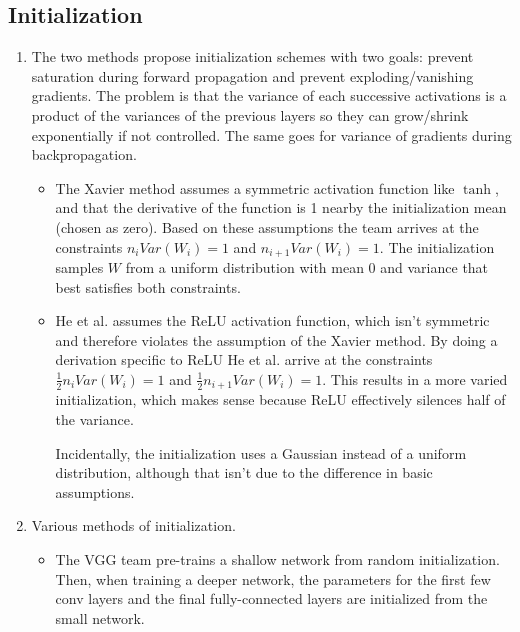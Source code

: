 \documentclass[a4paper]{article}
\begin{document}
\setcounter{section}{2}
\setcounter{subsection}{2}

\subsection{Initialization}

\begin{enumerate}

\item The two methods propose initialization schemes with two goals: prevent saturation during forward propagation and prevent exploding/vanishing gradients. The problem is that the variance of each successive activations is a product of the variances of the previous layers so they can grow/shrink exponentially if not controlled. The same goes for variance of gradients during backpropagation.

\begin{itemize}
\item The Xavier method \cite{glorot2010understanding} assumes a symmetric activation function like $\tanh$, and that the derivative of the function is 1 nearby the initialization mean (chosen as zero). Based on these assumptions the team arrives at the constraints $n_i Var (W_i) = 1$ and $n_{i+1} Var (W_i) = 1$. The initialization samples $W$ from a uniform distribution with mean 0 and variance that best satisfies both constraints.

\item He et al. \cite{he2015delving} assumes the ReLU activation function,  which isn't symmetric and therefore violates the assumption of the Xavier method. By doing a derivation specific to ReLU He et al. arrive at the constraints $\frac{1}{2} n_i Var(W_i) = 1$ and $\frac{1}{2} n_{i+1} Var(W_i) = 1$. This results in a more varied initialization, which makes sense because ReLU effectively silences half of the variance.

Incidentally, the initialization uses a Gaussian instead of a uniform distribution, although that isn't due to the difference in basic assumptions.

\end{itemize}

\item Various methods of initialization.
\begin{itemize}

\item The VGG team \cite{simonyan2014very} pre-trains a shallow network from random initialization. Then, when training a deeper network, the parameters for the first few conv layers and the final fully-connected layers are initialized from the small network.


\end{itemize}
\end{enumerate}
\end{document}
